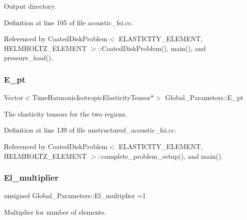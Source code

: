 Output directory. 



Definition at line 105 of file acoustic\+\_\+fsi.\+cc.



Referenced by Coated\+Disk\+Problem$<$ E\+L\+A\+S\+T\+I\+C\+I\+T\+Y\+\_\+\+E\+L\+E\+M\+E\+N\+T, H\+E\+L\+M\+H\+O\+L\+T\+Z\+\_\+\+E\+L\+E\+M\+E\+N\+T $>$\+::\+Coated\+Disk\+Problem(), main(), and pressure\+\_\+load().

\mbox{\label{namespaceGlobal__Parameters_a73c731fa617a9d92851e4195493262e7}} 
\subsubsection{\texorpdfstring{E\+\_\+pt}{E\_pt}}
{\footnotesize\ttfamily Vector$<$Time\+Harmonic\+Isotropic\+Elasticity\+Tensor$\ast$$>$ Global\+\_\+\+Parameters\+::\+E\+\_\+pt}



The elasticity tensors for the two regions. 



Definition at line 139 of file unstructured\+\_\+acoustic\+\_\+fsi.\+cc.



Referenced by Coated\+Disk\+Problem$<$ E\+L\+A\+S\+T\+I\+C\+I\+T\+Y\+\_\+\+E\+L\+E\+M\+E\+N\+T, H\+E\+L\+M\+H\+O\+L\+T\+Z\+\_\+\+E\+L\+E\+M\+E\+N\+T $>$\+::complete\+\_\+problem\+\_\+setup(), and main().

\mbox{\label{namespaceGlobal__Parameters_a35d5d2ecfff0cec6150a5dc79e5c1ad1}} 
\subsubsection{\texorpdfstring{El\+\_\+multiplier}{El\_multiplier}}
{\footnotesize\ttfamily unsigned Global\+\_\+\+Parameters\+::\+El\+\_\+multiplier =1}



Multiplier for number of elements. 



